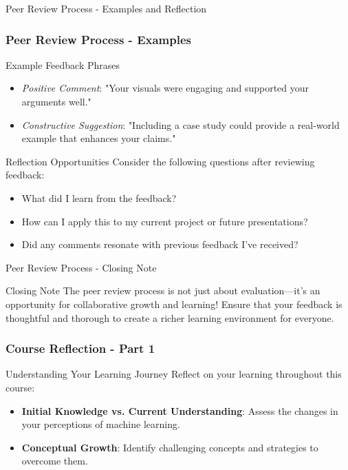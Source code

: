 \documentclass[aspectratio=169]{beamer}
\begin{document}
\begin{frame}[fragile]{Peer Review Process - Examples and Reflection}
    \frametitle{Peer Review Process - Examples}
    \begin{block}{Example Feedback Phrases}
        \begin{itemize}
            \item \textit{Positive Comment}: "Your visuals were engaging and supported your arguments well."
            \item \textit{Constructive Suggestion}: "Including a case study could provide a real-world example that enhances your claims."
        \end{itemize}
    \end{block}

    \begin{block}{Reflection Opportunities}
        Consider the following questions after reviewing feedback:
        \begin{itemize}
            \item What did I learn from the feedback?
            \item How can I apply this to my current project or future presentations?
            \item Did any comments resonate with previous feedback I've received?
        \end{itemize}
    \end{block}
\end{frame}

\begin{frame}[fragile]{Peer Review Process - Closing Note}
    \begin{block}{Closing Note}
        The peer review process is not just about evaluation—it’s an opportunity for collaborative growth and learning! 
        Ensure that your feedback is thoughtful and thorough to create a richer learning environment for everyone.
    \end{block}
\end{frame}

\begin{frame}[fragile]
    \frametitle{Course Reflection - Part 1}

    \begin{block}{Understanding Your Learning Journey}
        Reflect on your learning throughout this course:
        \begin{itemize}
            \item \textbf{Initial Knowledge vs. Current Understanding}:
            Assess the changes in your perceptions of machine learning.
            \item \textbf{Conceptual Growth}:
            Identify challenging concepts and strategies to overcome them.
        \end{itemize}
    \end{block}
\end{frame}
\end{document}
